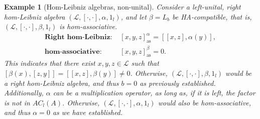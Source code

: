 \documentclass[12pt]{article}
\newtheorem{example}[theorem]{Example}
\begin{document}
\begin{example}[Hom-Leibniz algebras, non-unital]
			
			Consider a left-unital, right hom-Leibniz algebra $(\mathcal{L},[\cdot,\cdot],\alpha,1_l)$, and let $\beta=L_b$ be HA-compatible, that is, $(\mathcal{L},[\cdot,\cdot],\beta,1_l)$ is hom-associative.
			\begin{align*}
				\textbf{Right hom-Leibniz: }& [x,y,z]_{\mathrm{as}}^\alpha=[[x,z],\alpha(y)], \\
				\textbf{hom-associative: }& [x,y,z]_{\mathrm{as}}^\beta=0.
			\end{align*}
			This indicates that there exist $x,y,z\in\mathcal{L}$ such that $[\beta(x),[z,y]]=[[x,z],\beta(y)]\neq 0$. Otherwise, $(\mathcal{L},[\cdot,\cdot],\beta,1_l)$ would be a right hom-Leibniz algebra, and thus $b=0$ as previously established. Additionally, $\alpha$ can be a multiplication operator, as long as, if it is left,  the factor is not in $AC_l(A)$. Otherwise, $(\mathcal{L},[\cdot,\cdot],\alpha,1_l)$ would also be hom-associative, and thus $\alpha=0$ as we have established.
			
		\end{example}
		
\end{document}

